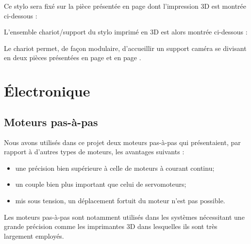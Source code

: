\documentclass[12pt,a4paper]{report}
\begin{document}
	
	Ce stylo sera fixé sur la pièce présentée en page \pageref{supportstylo} dont l'impression 3D est montrée ci-dessous :
	
	
L'ensemble chariot/support du stylo imprimé en 3D est alors montrée ci-dessous :


Le chariot permet, de façon modulaire, d'accueillir un support caméra se divisant en deux pièces présentées en page \pageref{chariotcamera} et en page \pageref{supportcamera}.
	

	\chapter{Électronique}
\section{Moteurs pas-à-pas}
\label{Elec_stepper}
Nous avons utilisés dans ce projet deux moteurs pas-à-pas qui présentaient, par rapport à d'autres types de moteurs, les avantages suivants : 
\begin{itemize}[label=--,itemsep=0pt,font=\bf\Large,labelsep=5mm]
\item une précision bien supérieure à celle de moteurs à courant continu;
\item un couple bien plus important que celui de servomoteurs;
\item mis sous tension, un déplacement fortuit du moteur n'est pas possible.
\end{itemize}
Les moteurs pas-à-pas sont notamment utilisés dans les systèmes nécessitant une grande précision comme les imprimantes 3D dans lesquelles ils sont très largement employés.
\end{document}
